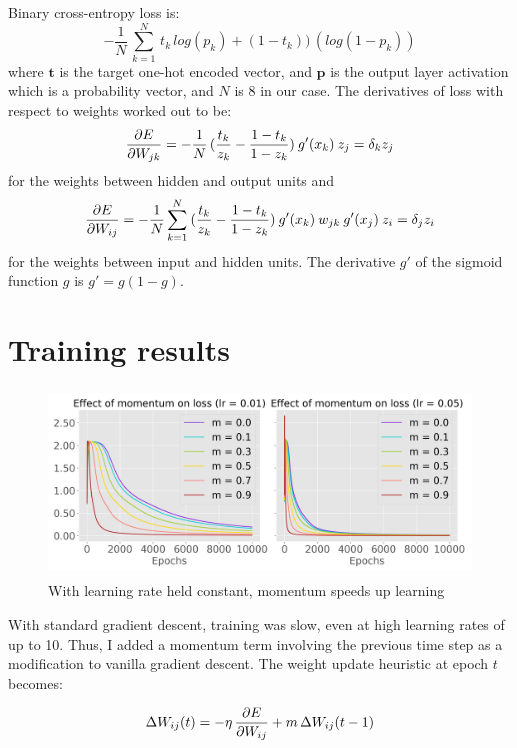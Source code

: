 \documentclass[12pt]{article}
\begin{document}
Binary cross-entropy loss is:
\begin{equation}
    -\frac{1}{N}\,\sum_{k=1}^{N}\,t_{k}\,log(p_{k}) + (1-t_{k}))\,(log(1-p_{k}))
\end{equation}
where $\mathbf{t}$ is the target one-hot encoded vector, and $\mathbf{p}$ is the output layer activation which is a probability vector, and $N$ is 8 in our case. The derivatives of loss with respect to weights worked out to be:
\begin{equation}
    \pdv{E}{W_{jk}} = -\frac{1}{N}\,(\frac{t_{k}}{z_{k}}-\frac{1-t_{k}}{1-z_{k}})\: g'(x_{k})\: z_{j} = \delta_{k}z_{j}
\end{equation}
for the weights between hidden and output units and 
\begin{equation}
    \pdv{E}{W_{ij}} = -\frac{1}{N} \sum\limits_{k=1}^{N} \: (\frac{t_{k}}{z_{k}}-\frac{1-t_{k}}{1-z_{k}})\: g'(x_{k}) \: w_{jk} \: g'(x_{j}) \: z_{i} = \delta_{j}z_{i}
\end{equation}
for the weights between input and hidden units. The derivative $g'$ of the sigmoid function $g$ is $g' = g(1-g)$.

\section{Training results}

\begin{figure}[htbp]
    \centering
    \includegraphics[width=12cm, height=5cm]{mlp_m}
    \caption{With learning rate held constant, momentum speeds up learning}
    \label{fig:mlp_momentum}
\end{figure}

With standard gradient descent, training was slow, even at high learning rates of up to 10. Thus, I added a momentum term involving the previous time step as a modification to vanilla gradient descent. The weight update heuristic at epoch $t$ becomes:

\begin{equation}
    \Delta W_{ij}(t) = -\eta \, \pdv{E}{W_{ij}} + m \,\Delta W_{ij}(t-1)
\end{equation}
\end{document}
